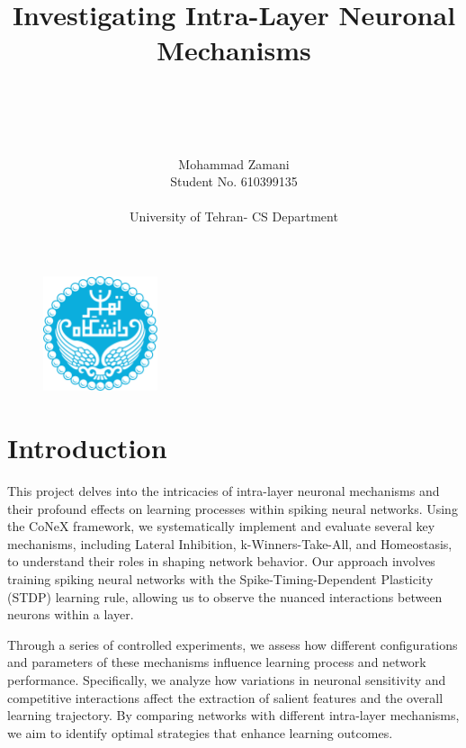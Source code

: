 \documentclass[12pt]{article}
\title{\textbf{\huge Investigating Intra-Layer Neuronal Mechanisms}\\[1ex]  \\[1ex] \\[1ex]}
\author{\Large{ Mohammad Zamani}  \\ \Large{Student No. 610399135} \\ \\ \Large{University of Tehran- CS Department}}
\date{}
\begin{document}

	
	\begin{titlingpage}
	
	\begin{figure}
		\centering
		\includegraphics[width=0.3\textwidth]{Figs/University_of_Tehran_logo.png}		

	\end{figure}		\maketitle
	
	\end{titlingpage}
		
	



	\setlength{\parindent}{20pt}
	\tableofcontents
	
	\vspace{1\baselineskip}

	\pagebreak

	\section{Introduction}
	
	This project delves into the intricacies of intra-layer neuronal mechanisms and their profound effects on learning processes within spiking neural networks. Using the CoNeX framework, we systematically implement and evaluate several key mechanisms, including Lateral Inhibition, k-Winners-Take-All, and Homeostasis, to understand their roles in shaping network behavior. Our approach involves training spiking neural networks with the Spike-Timing-Dependent Plasticity (STDP) learning rule, allowing us to observe the nuanced interactions between neurons within a layer.

Through a series of controlled experiments, we assess how different configurations and parameters of these mechanisms influence learning process and network performance. Specifically, we analyze how variations in neuronal sensitivity and competitive interactions affect the extraction of salient features and the overall learning trajectory. By comparing networks with different intra-layer mechanisms, we aim to identify optimal strategies that enhance learning outcomes.
\end{document}
